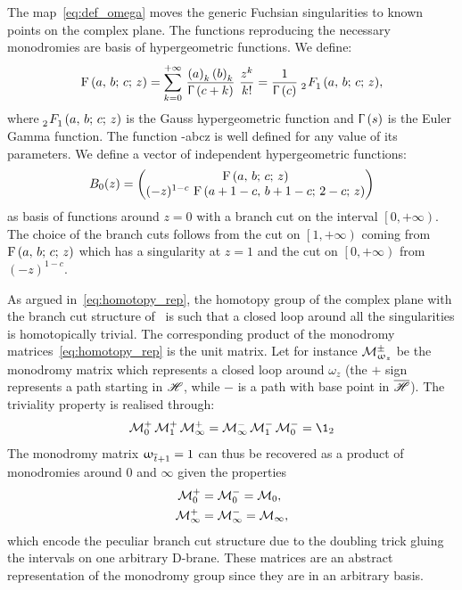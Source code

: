 The map~\eqref{eq:def_omega} moves the generic Fuchsian singularities to known points on the complex plane.
The functions reproducing the necessary monodromies are basis of hypergeometric functions.
We define:
\begin{equation}
  \hyp{a}{b}{c}{z}
  =
  \zeroinfsum{k}\,
  \frac{\poch{a}{k}\poch{b}{k}}{\gfun{c+k}}~
  \frac{z^k}{k!}
  =
  \frac{1}{\gfun{c}}~
  \tensor[_2]{F}{_1}(a,\, b;\, c;\, z),
\end{equation}
where $\tensor[_2]{F}{_1}(a,\, b;\, c;\, z)$ is the Gauss hypergeometric function and $\Upgamma\left( s \right)$ is the Euler Gamma function.
The function \hyp{a}{b}{c}{z} is well defined for any value of its parameters.\footnotemark{}
We define a vector of independent hypergeometric functions:
\begin{equation}
  B_{0}(z)
  =
  \mqty(
    \hyp{a}{b}{c}{z}
    \\
    (-z)^{1-c}~\hyp{a+1-c}{b+1-c}{2-c}{z}
  )
  \label{eq:basis_0}
\end{equation}
as basis of functions around $z = 0$ with a branch cut on the interval $\left[ 0, +\infty \right)$.
The choice of the branch cuts follows from the cut on $\left[ 1, +\infty \right)$ coming from $\mathrm{F}\left( a,\, b;\, c;\, z \right)$ which has a singularity at $z = 1$ and the cut on $\left[ 0, +\infty \right)$ from $(-z)^{1-c}$.

As argued in~\eqref{eq:homotopy_rep}, the homotopy group of the complex plane with the branch cut structure of~ is such that a closed loop around all the singularities is homotopically trivial.
The corresponding product of the monodromy matrices~\eqref{eq:homotopy_rep} is the unit matrix.
Let for instance $\mathcal{M}_{\upomega_z}^{\pm}$ be the monodromy matrix which represents a closed loop around $\omega_z$ (the $+$ sign represents a path starting in $\mathscr{H}$, while $-$ is a path with base point in $\overline{\mathscr{H}}$).
The triviality property is realised through:
\begin{equation}
  \cM_{0}^+\,
  \cM_{1}^+\,
  \cM_{\infty}^+
  =
  \cM_{\infty}^-\,
  \cM_{1}^-\,
  \cM_{0}^-
  =
  \1_2
  \label{eq:monodromy_relations}
\end{equation}
The monodromy matrix $\upomega_{\overline{t}+1} = 1$ can thus be recovered as a product of monodromies around $0$ and $\infty$ given the properties
\begin{equation}
  \begin{split}
    \mathcal{M}_{0}^+
    & =
    \mathcal{M}_{0}^-
    =
    \mathcal{M}_{0},
    \\
    \mathcal{M}_{\infty}^+
    & =
    \mathcal{M}_{\infty}^-
    =
    \mathcal{M}_{\infty},
  \end{split}
\end{equation}
which encode the peculiar branch cut structure due to the doubling trick gluing the intervals on one arbitrary D-brane.
These matrices are an abstract representation of the monodromy group since they are in an arbitrary basis.

